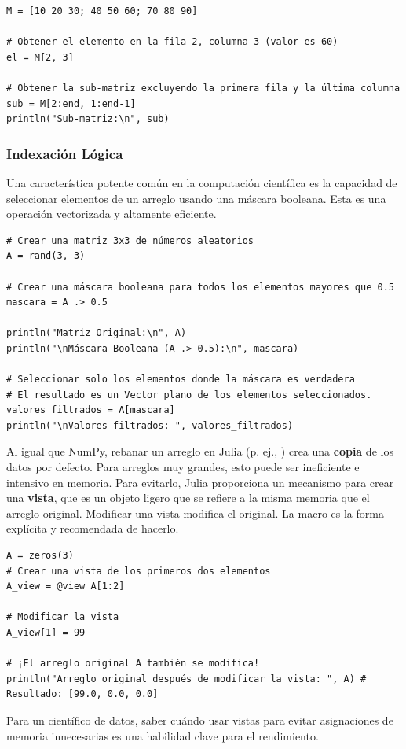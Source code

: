 \begin{example}
\text{ }\begin{verbatim}
M = [10 20 30; 40 50 60; 70 80 90]

# Obtener el elemento en la fila 2, columna 3 (valor es 60)
el = M[2, 3]

# Obtener la sub-matriz excluyendo la primera fila y la última columna
sub = M[2:end, 1:end-1]
println("Sub-matriz:\n", sub)
\end{verbatim}
\end{example}

\subsubsection*{Indexación Lógica}
Una característica potente común en la computación científica es la capacidad de seleccionar elementos de un arreglo usando una máscara booleana. Esta es una operación vectorizada y altamente eficiente.

\begin{example}
\text{ }\begin{verbatim}
# Crear una matriz 3x3 de números aleatorios
A = rand(3, 3)

# Crear una máscara booleana para todos los elementos mayores que 0.5
mascara = A .> 0.5

println("Matriz Original:\n", A)
println("\nMáscara Booleana (A .> 0.5):\n", mascara)

# Seleccionar solo los elementos donde la máscara es verdadera
# El resultado es un Vector plano de los elementos seleccionados.
valores_filtrados = A[mascara]
println("\nValores filtrados: ", valores_filtrados)
\end{verbatim}
\end{example}

\begin{remark}
Al igual que NumPy, rebanar un arreglo en Julia (p. ej., ) crea una \textbf{copia} de los datos por defecto. Para arreglos muy grandes, esto puede ser ineficiente e intensivo en memoria. Para evitarlo, Julia proporciona un mecanismo para crear una \textbf{vista}, que es un objeto ligero que se refiere a la misma memoria que el arreglo original. Modificar una vista modifica el original. La macro  es la forma explícita y recomendada de hacerlo.

\begin{verbatim}
A = zeros(3)
# Crear una vista de los primeros dos elementos
A_view = @view A[1:2]

# Modificar la vista
A_view[1] = 99

# ¡El arreglo original A también se modifica!
println("Arreglo original después de modificar la vista: ", A) # Resultado: [99.0, 0.0, 0.0]
\end{verbatim}
Para un científico de datos, saber cuándo usar vistas para evitar asignaciones de memoria innecesarias es una habilidad clave para el rendimiento.
\end{remark}

